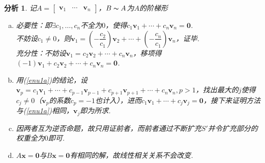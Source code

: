 \documentclass[11pt,UTF8]{ctexart}
\newtheorem*{analysis}{分析}
\def\vx{\mathbf{x}}
\def\vv{\mathbf{v}}
\newcommand{\vb}[1]{\mathbf{#1}}
\newcommand{\bmat}[2]{\begin{bmatrix}{#1}&\cdots&{#2}\end{bmatrix}}
\begin{document}
\begin{analysis}
记$A=\bmat{\vb{v}_1}{\vb{v}_n}$，$B\thicksim A$为$A$的阶梯形
\begin{enumerate}[(a)]
	\item \label{enu1a}必要性：即$\exists c_1,\dots,c_n$不全为$0$，使得$c_1\vb{v}_1+\cdots+c_n\vb{v}_n=\vb{0}$.\\
	不妨设$c_1\ne 0$，则$\vb{v}_1=(-\dfrac{c_2}{c_1})\vv_2+\cdots+(-\dfrac{c_n}{c_1})\vb{v}_n$，证毕.\\
	充分性：不妨设$\vb{v}_1=c_2\vb{v}_2+\cdots+c_n\vb{v}_n$，移项得$(-1)\vb{v}_1+c_2\vb{v}_2+\cdots+c_n\vb{v}_n=\vb{0}$.
	\item 用(\ref{enu1a})的结论，设$\vb{v}_p=c_1\vb{v}_1+\cdots+c_{p-1}\vb{v}_{p-1}+c_{p+1}\vb{v}_{p+1}+\cdots+c_n\vb{v}_n,p>1$，找出最大的$j$使得$c_j\ne 0$（$\vb{v}_p$的系数$c_p=-1$也计入），进而$c_1\vb{v}_1+\cdots+c_j\vb{v}_j=\vb{0}$，接下来证明方法与(\ref{enu1a})相同，$\vb{v}_j$即为所求.
	\item 因两者互为逆否命题，故只用证前者，而前者通过不断扩充$S'$并令扩充部分的权重全为$0$即可.
	\item $A\vx=\vb{0}$与$B\vx=\vb{0}$有相同的解，故线性相关关系不会改变.
\end{enumerate}
\end{analysis}
\end{document}

